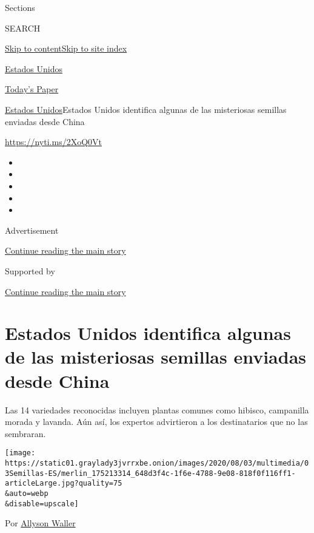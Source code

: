 Sections

SEARCH

\protect\hyperlink{site-content}{Skip to
content}\protect\hyperlink{site-index}{Skip to site index}

\href{https://www.nytimes3xbfgragh.onion/es/section/estados-unidos}{Estados
Unidos}

\href{https://myaccount.nytimes3xbfgragh.onion/auth/login?response_type=cookie\&client_id=vi}{}

\href{https://www.nytimes3xbfgragh.onion/section/todayspaper}{Today's
Paper}

\href{/es/section/estados-unidos}{Estados Unidos}\textbar{}Estados
Unidos identifica algunas de las misteriosas semillas enviadas desde
China

\url{https://nyti.ms/2XoQ0Vt}

\begin{itemize}
\item
\item
\item
\item
\item
\end{itemize}

Advertisement

\protect\hyperlink{after-top}{Continue reading the main story}

Supported by

\protect\hyperlink{after-sponsor}{Continue reading the main story}

\hypertarget{estados-unidos-identifica-algunas-de-las-misteriosas-semillas-enviadas-desde-china}{%
\section{Estados Unidos identifica algunas de las misteriosas semillas
enviadas desde
China}\label{estados-unidos-identifica-algunas-de-las-misteriosas-semillas-enviadas-desde-china}}

Las 14 variedades reconocidas incluyen plantas comunes como hibisco,
campanilla morada y lavanda. Aún así, los expertos advirtieron a los
destinatarios que no las sembraran.

\texttt{[image: https://static01.graylady3jvrrxbe.onion/images/2020/08/03/multimedia/03Semillas-ES/merlin\_175213314\_648d3f4c-1f6e-4788-9e08-818f0f116ff1-articleLarge.jpg?quality=75\\\&auto=webp\\\&disable=upscale]}

Por \href{https://www.nytimes3xbfgragh.onion/by/allyson-waller}{Allyson
Waller}

